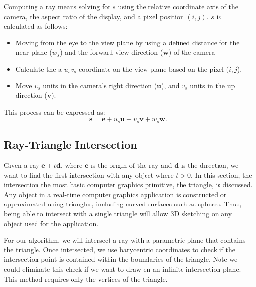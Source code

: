 Computing a ray means solving for $s$ using the relative coordinate axis of the camera, the aspect ratio of the display, and a pixel position $(i,j)$.
$s$ is calculated as follows:
\begin{itemize}
\item Moving from the eye to the view plane by using a defined distance for the near plane ($w_s$) and the forward view direction ($\mathbf{w}$) of the camera
\item Calculate the a $u_sv_s$ coordinate on the view plane based on the pixel $(i,j$).
\item Move $u_s$ units in the camera's right direction ($\mathbf{u}$), and $v_s$ units in the up direction ($\mathbf{v}$).
\end{itemize}
This process can be expressed as:
\begin{equation}
\mathbf{s} = \mathbf{e} + u_s\mathbf{u} +v_s\mathbf{v}+w_s\mathbf{w}.
\end{equation}


\subsection{Ray-Triangle Intersection}

Given a ray $\mathbf{e} + t\mathbf{d}$, where $\mathbf{e}$ is the origin of the ray and $\mathbf{d}$ is the direction, we want to find the first intersection with any object where $t > 0$.
In this section, the intersection the most basic computer graphics primitive, the triangle, is discussed.
Any object in a real-time computer graphics application is constructed or approximated using triangles, including curved surfaces such as spheres.
Thus, being able to intersect with a single triangle will allow 3D sketching on any object used for the application.

For our algorithm, we will intersect a ray with a parametric plane that contains the triangle.
Once intersected, we use barycentric coordinates to check if the intersection point is contained within the boundaries of the triangle. 
Note we could eliminate this check if we want to draw on an infinite intersection plane.
This method requires only the vertices of the triangle.

